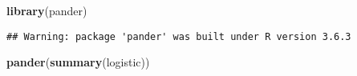 \documentclass[
]{article}
\newenvironment{Shaded}{\begin{snugshade}}{\end{snugshade}}
\newcommand{\KeywordTok}[1]{\textcolor[rgb]{0.13,0.29,0.53}{\textbf{#1}}}
\newcommand{\NormalTok}[1]{#1}
\begin{document}
\begin{Shaded}
\begin{Highlighting}[]
\KeywordTok{library}\NormalTok{(pander)}
\end{Highlighting}
\end{Shaded}

\begin{verbatim}
## Warning: package 'pander' was built under R version 3.6.3
\end{verbatim}

\begin{Shaded}
\begin{Highlighting}[]
\KeywordTok{pander}\NormalTok{(}\KeywordTok{summary}\NormalTok{(logistic))}
\end{Highlighting}
\end{Shaded}
\end{document}
